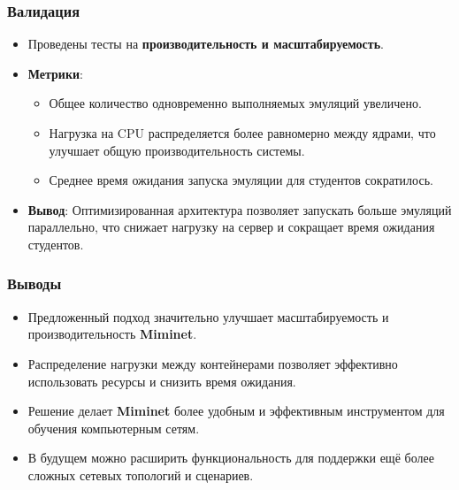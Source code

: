 \documentclass{beamer}
\begin{document}
\begin{frame}[fragile]
  \frametitle{Валидация}
  \begin{itemize}
    \item Проведены тесты на \textbf{производительность и масштабируемость}.
    \item \textbf{Метрики}:
      \begin{itemize}
        \item Общее количество одновременно выполняемых эмуляций увеличено.
        \item Нагрузка на CPU распределяется более равномерно между ядрами, что улучшает общую производительность системы.
        \item Среднее время ожидания запуска эмуляции для студентов сократилось.
      \end{itemize}
    \item \textbf{Вывод}: Оптимизированная архитектура позволяет запускать больше эмуляций параллельно, что снижает нагрузку на сервер и сокращает время ожидания студентов.
  \end{itemize}
\end{frame}


\begin{frame}[fragile]
  \frametitle{Выводы}
  \begin{itemize}
    \item Предложенный подход значительно улучшает масштабируемость и производительность \textbf{Miminet}.
    \item Распределение нагрузки между контейнерами позволяет эффективно использовать ресурсы и снизить время ожидания.
    \item Решение делает \textbf{Miminet} более удобным и эффективным инструментом для обучения компьютерным сетям.
    \item В будущем можно расширить функциональность для поддержки ещё более сложных сетевых топологий и сценариев.
  \end{itemize}
\end{frame}


\end{document}
